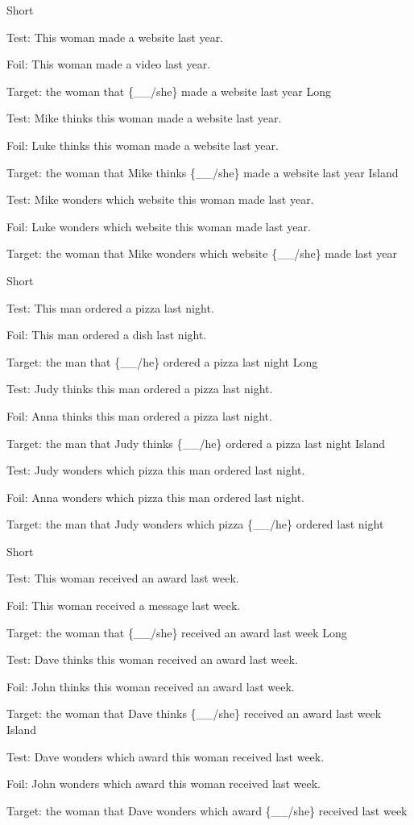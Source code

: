 \pex %
\a Short\par\nobreak
Test: This woman made a website last year.\par\nobreak
Foil: This woman made a video last year.\par\nobreak
Target: the woman that \{\_\_/she\} made a website last year
\a Long\par\nobreak
Test: Mike thinks this woman made a website last year.\par\nobreak
Foil: Luke thinks this woman made a website last year.\par\nobreak
Target: the woman that Mike thinks \{\_\_/she\} made a website last year
\a Island\par\nobreak
Test: Mike wonders which website this woman made last year.\par\nobreak
Foil: Luke wonders which website this woman made last year.\par\nobreak
Target: the woman that Mike wonders which website \{\_\_/she\} made last year
\xe

\pex %
\a Short\par\nobreak
Test: This man ordered a pizza last night.\par\nobreak
Foil: This man ordered a dish last night.\par\nobreak
Target: the man that \{\_\_/he\} ordered a pizza last night
\a Long\par\nobreak
Test: Judy thinks this man ordered a pizza last night.\par\nobreak
Foil: Anna thinks this man ordered a pizza last night.\par\nobreak
Target: the man that Judy thinks \{\_\_/he\} ordered a pizza last night
\a Island\par\nobreak
Test: Judy wonders which pizza this man ordered last night.\par\nobreak
Foil: Anna wonders which pizza this man ordered last night.\par\nobreak
Target: the man that Judy wonders which pizza \{\_\_/he\} ordered last night
\xe

\pex %
\a Short\par\nobreak
Test: This woman received an award last week.\par\nobreak
Foil: This woman received a message last week.\par\nobreak
Target: the woman that \{\_\_/she\} received an award last week
\a Long\par\nobreak
Test: Dave thinks this woman received an award last week.\par\nobreak
Foil: John thinks this woman received an award last week.\par\nobreak
Target: the woman that Dave thinks \{\_\_/she\} received an award last week
\a Island\par\nobreak
Test: Dave wonders which award this woman received last week.\par\nobreak
Foil: John wonders which award this woman received last week.\par\nobreak
Target: the woman that Dave wonders which award \{\_\_/she\} received last week
\xe

